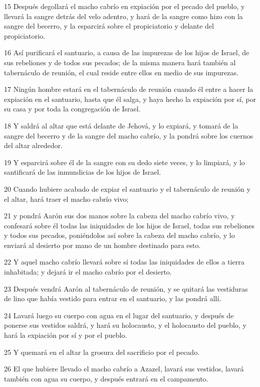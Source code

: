 \par 15 Después degollará el macho cabrío en expiación por el pecado del pueblo, y llevará la sangre detrás del velo adentro, y hará de la sangre como hizo con la sangre del becerro, y la esparcirá sobre el propiciatorio y delante del propiciatorio.
\par 16 Así purificará el santuario, a causa de las impurezas de los hijos de Israel, de sus rebeliones y de todos sus pecados; de la misma manera hará también al tabernáculo de reunión, el cual reside entre ellos en medio de sus impurezas.
\par 17 Ningún hombre estará en el tabernáculo de reunión cuando él entre a hacer la expiación en el santuario, hasta que él salga, y haya hecho la expiación por sí, por su casa y por toda la congregación de Israel.
\par 18 Y saldrá al altar que está delante de Jehová, y lo expiará, y tomará de la sangre del becerro y de la sangre del macho cabrío, y la pondrá sobre los cuernos del altar alrededor.
\par 19 Y esparcirá sobre él de la sangre con su dedo siete veces, y lo limpiará, y lo santificará de las inmundicias de los hijos de Israel.
\par 20 Cuando hubiere acabado de expiar el santuario y el tabernáculo de reunión y el altar, hará traer el macho cabrío vivo;
\par 21 y pondrá Aarón sus dos manos sobre la cabeza del macho cabrío vivo, y confesará sobre él todas las iniquidades de los hijos de Israel, todas sus rebeliones y todos sus pecados, poniéndolos así sobre la cabeza del macho cabrío, y lo enviará al desierto por mano de un hombre destinado para esto.
\par 22 Y aquel macho cabrío llevará sobre sí todas las iniquidades de ellos a tierra inhabitada; y dejará ir el macho cabrío por el desierto.
\par 23 Después vendrá Aarón al tabernáculo de reunión, y se quitará las vestiduras de lino que había vestido para entrar en el santuario, y las pondrá allí.
\par 24 Lavará luego su cuerpo con agua en el lugar del santuario, y después de ponerse sus vestidos saldrá, y hará su holocausto, y el holocausto del pueblo, y hará la expiación por sí y por el pueblo.
\par 25 Y quemará en el altar la grosura del sacrificio por el pecado.
\par 26 El que hubiere llevado el macho cabrío a Azazel, lavará sus vestidos, lavará también con agua su cuerpo, y después entrará en el campamento.
